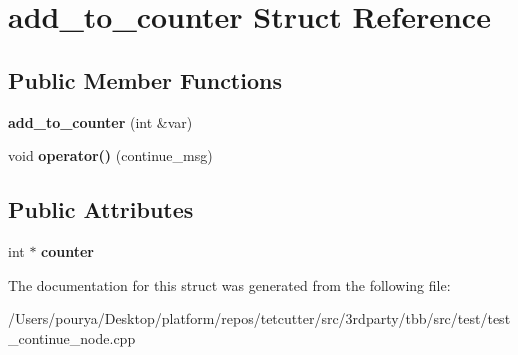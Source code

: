 \hypertarget{structadd__to__counter}{}\section{add\+\_\+to\+\_\+counter Struct Reference}
\label{structadd__to__counter}
\subsection*{Public Member Functions}
\begin{DoxyCompactItemize}
\item 
\hypertarget{structadd__to__counter_a80c16e12b2abc2ce875bb8a485c4b4fb}{}{\bfseries add\+\_\+to\+\_\+counter} (int \&var)\label{structadd__to__counter_a80c16e12b2abc2ce875bb8a485c4b4fb}

\item 
\hypertarget{structadd__to__counter_a767a60cbb5f637acf1184edce7848df5}{}void {\bfseries operator()} (continue\+\_\+msg)\label{structadd__to__counter_a767a60cbb5f637acf1184edce7848df5}

\end{DoxyCompactItemize}
\subsection*{Public Attributes}
\begin{DoxyCompactItemize}
\item 
\hypertarget{structadd__to__counter_af7b1044877f7dfc24cd7960620c79360}{}int $\ast$ {\bfseries counter}\label{structadd__to__counter_af7b1044877f7dfc24cd7960620c79360}

\end{DoxyCompactItemize}


The documentation for this struct was generated from the following file\+:\begin{DoxyCompactItemize}
\item 
/\+Users/pourya/\+Desktop/platform/repos/tetcutter/src/3rdparty/tbb/src/test/test\+\_\+continue\+\_\+node.\+cpp\end{DoxyCompactItemize}
